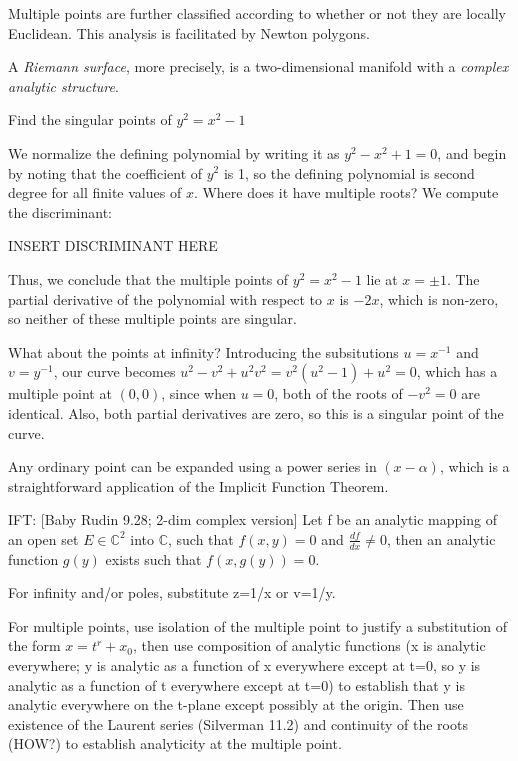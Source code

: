 Multiple points are further classified according to whether or not
they are locally Euclidean.  This analysis is facilitated by Newton
polygons.

A {\it Riemann surface}, more precisely, is a two-dimensional manifold
with a {\it complex analytic structure}.

\example Find the singular points of $y^2 = x^2 - 1$

We normalize the defining polynomial by writing it as $y^2 - x^2 + 1 =
0$, and begin by noting that the coefficient of $y^2$ is 1, so the
defining polynomial is second degree for all finite values of $x$.
Where does it have multiple roots?  We compute the discriminant:

INSERT DISCRIMINANT HERE

Thus, we conclude that the multiple points of $y^2 = x^2 - 1$ lie at
$x = \pm 1$.  The partial derivative of the polynomial with respect to
$x$ is $-2x$, which is non-zero, so neither of these multiple points
are singular.

What about the points at infinity?  Introducing the subsitutions
$u=x^{-1}$ and $v=y^{-1}$, our curve becomes $u^2 - v^2 + u^2 v^2 =
v^2 (u^2 - 1) + u^2 = 0$, which has a multiple point at $(0,0)$,
since when $u=0$, both of the roots of $-v^2 = 0$ are identical.
Also, both partial derivatives are zero, so this is a singular
point of the curve.

\endexample

Any ordinary point can be expanded using a power series in
$(x-\alpha)$, which is a straightforward application of the Implicit
Function Theorem.

IFT: [Baby Rudin 9.28; 2-dim complex version] Let f be an analytic
mapping of an open set $E \in {\mathbb C}^2$ into ${\mathbb C}$, such
that $f(x,y)=0$ and $\frac{df}{dx} \ne 0$, then an analytic
function $g(y)$ exists such that $f(x,g(y))=0$.

For infinity and/or poles, substitute z=1/x or v=1/y.

For multiple points, use isolation of the multiple point to justify a
substitution of the form $x=t^r+x_0$, then use composition of analytic
functions (x is analytic everywhere; y is analytic as a function of x
everywhere except at t=0, so y is analytic as a function of t
everywhere except at t=0) to establish that y is analytic everywhere
on the t-plane except possibly at the origin.  Then use existence of
the Laurent series (Silverman 11.2) and continuity of the roots (HOW?)
to establish analyticity at the multiple point.

